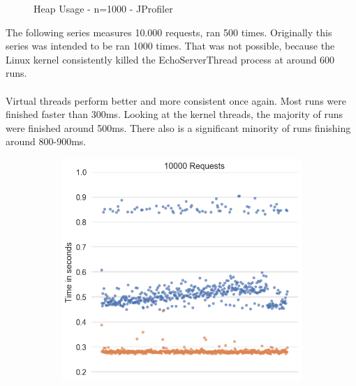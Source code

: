\begin{figure}[H]
\begin{subfigure}[b]{0.3\textwidth}
  \end{subfigure}
  \caption{Heap Usage - n=1000 - JProfiler}
\end{figure}

\pagebreak
The following series measures 10.000 requests, ran 500 times. Originally this series was intended to be ran 1000 times. That was not possible, because the Linux kernel consistently killed the EchoServerThread process at around 600 runs.
\\
\\
Virtual threads perform better and more consistent once again. Most runs were finished faster than 300ms. Looking at the kernel threads, the majority of runs were finished around 500ms. There also is a significant minority of runs finishing around 800-900ms.
\begin{figure}[H]
  \centering
  \begin{subfigure}[b]{0.45\textwidth}
    \includegraphics[width=1.0\linewidth]{img/footprint/scatter-500.png}
  \end{subfigure}
  \begin{subfigure}[b]{0.45\textwidth}

\end{subfigure}
\end{figure}
